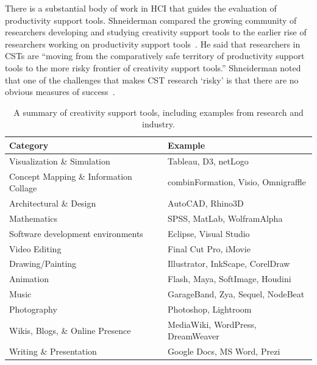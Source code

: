 \label{Intro}

There is a substantial body of work in HCI that guides the evaluation of productivity support tools. Shneiderman compared the growing community of researchers developing and studying creativity support tools to the earlier rise of researchers working on productivity support tools~\cite{Shneiderman:2007wp}. He said that researchers in CSTs are ``moving from the comparatively safe territory of productivity support tools to the more risky frontier of creativity support tools.'' Shneiderman noted that one of the challenges that makes CST research `risky' is that there are no obvious measures of success~\cite{Shneiderman:2007wp}. 

\begin{table}[t]
\centering
\scriptsize
\caption[Overview of Creativity Support Tools]{A summary of creativity support tools, including examples from research and industry.}
\begin{tabular}{|l|l|}
\hline
\textbf{Category} & \textbf{Example} \\
\hline
Visualization \& Simulation  & Tableau, D3, netLogo \\
Concept Mapping \& Information Collage & combinFormation, Visio, Omnigraffle \\
Architectural \& Design & AutoCAD, Rhino3D \\ 
Mathematics & SPSS, MatLab, WolframAlpha \\
Software development environments & Eclipse, Visual Studio \\
Video Editing & Final Cut Pro, iMovie \\
Drawing/Painting &  Illustrator, InkScape, CorelDraw \\
Animation & Flash, Maya, SoftImage, Houdini \\
Music & GarageBand, Zya, Sequel, NodeBeat \\
Photography & Photoshop, Lightroom \\
Wikis, Blogs, \& Online Presence  & MediaWiki, WordPress, DreamWeaver \\
Writing \& Presentation & Google Docs, MS Word, Prezi \\
\hline
\end{tabular}
\label{CSTSummary}
\end{table}%

